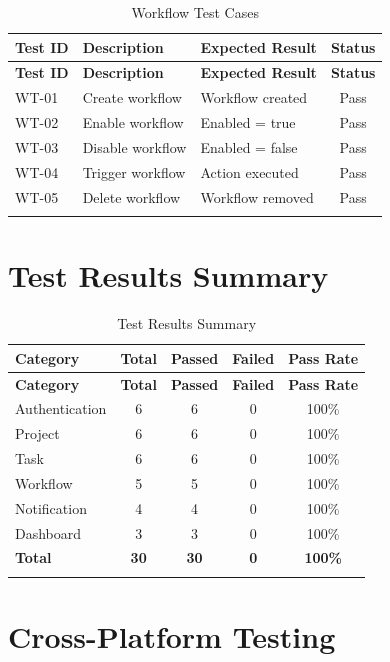 \documentclass[12pt,a4paper,twoside]{book}
\begin{document}
\begin{longtable}{|l|p{4cm}|p{3cm}|c|}
\hline
\textbf{Test ID} & \textbf{Description} & \textbf{Expected Result} & \textbf{Status} \\ \hline
\endfirsthead
\hline
\textbf{Test ID} & \textbf{Description} & \textbf{Expected Result} & \textbf{Status} \\ \hline
\endhead
WT-01 & Create workflow & Workflow created & Pass \\ \hline
WT-02 & Enable workflow & Enabled = true & Pass \\ \hline
WT-03 & Disable workflow & Enabled = false & Pass \\ \hline
WT-04 & Trigger workflow & Action executed & Pass \\ \hline
WT-05 & Delete workflow & Workflow removed & Pass \\ \hline
\caption{Workflow Test Cases}
\end{longtable}

\section{Test Results Summary}

\begin{longtable}{|l|c|c|c|c|}
\hline
\textbf{Category} & \textbf{Total} & \textbf{Passed} & \textbf{Failed} & \textbf{Pass Rate} \\ \hline
\endfirsthead
\hline
\textbf{Category} & \textbf{Total} & \textbf{Passed} & \textbf{Failed} & \textbf{Pass Rate} \\ \hline
\endhead
Authentication & 6 & 6 & 0 & 100\% \\ \hline
Project & 6 & 6 & 0 & 100\% \\ \hline
Task & 6 & 6 & 0 & 100\% \\ \hline
Workflow & 5 & 5 & 0 & 100\% \\ \hline
Notification & 4 & 4 & 0 & 100\% \\ \hline
Dashboard & 3 & 3 & 0 & 100\% \\ \hline
\textbf{Total} & \textbf{30} & \textbf{30} & \textbf{0} & \textbf{100\%} \\ \hline
\hline
\caption{Test Results Summary}
\end{longtable}

\section{Cross-Platform Testing}
\end{document}
